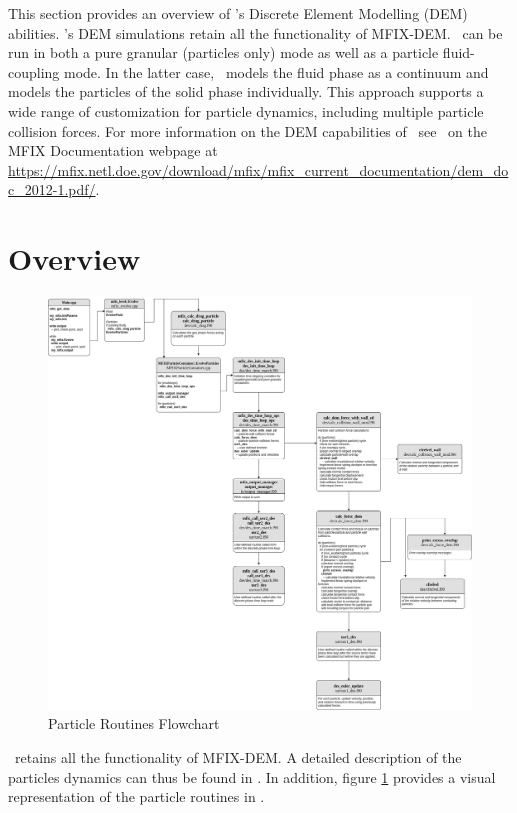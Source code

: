 This section provides an overview of \mfix's Discrete Element Modelling (DEM)
abilities. \mfix's DEM simulations retain all the functionality of MFIX-DEM.
\mfix\ can be run in both a pure granular (particles only) mode
as well as a particle fluid-coupling mode. In the latter case, \mfix\ models
the fluid phase as a continuum and models the
particles of the solid phase individually. This approach supports a wide range
of customization for particle dynamics, including multiple particle collision
forces. For more information on the DEM capabilities of \mfix\
see \demdoc\ on the MFIX Documentation webpage at
{\url{https://mfix.netl.doe.gov/download/mfix/mfix_current_documentation/dem_doc_2012-1.pdf/}}.

\section{Overview}

\begin{figure}
    \includegraphics[width=\linewidth,natwidth=800, natheight=600]{./Particles/MFIX-Particle-Diagram.png}
    \caption{Particle Routines Flowchart}
    \label{fig:pflowchart}
\end{figure}

\mfix\ retains all the functionality of MFIX-DEM. A detailed description of the
particles dynamics can thus be found in \demdoc.
In addition, figure \ref{fig:pflowchart} provides a visual representation
of the particle routines in \mfix.

